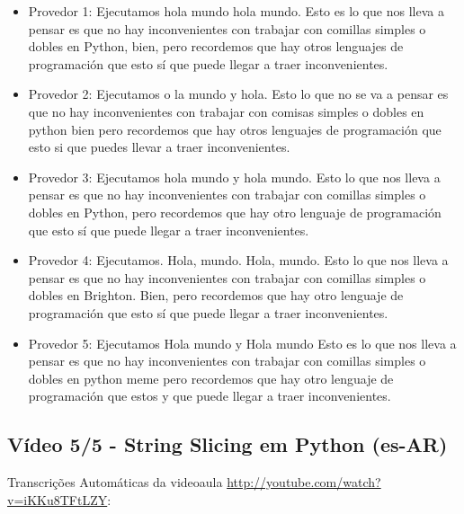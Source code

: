 \begin{itemize}
    \item Provedor 1: Ejecutamos hola mundo hola mundo. Esto es lo que nos lleva a pensar es que no hay inconvenientes con trabajar con comillas simples o dobles en Python, bien, pero recordemos que hay otros lenguajes de programación que esto sí que puede llegar a traer inconvenientes.
    \item Provedor 2: Ejecutamos o la mundo y hola. Esto lo que no se va a pensar es que no hay inconvenientes con trabajar con comisas simples o dobles en python bien pero recordemos que hay otros lenguajes de programación que esto si que puedes llevar a traer inconvenientes.
    \item Provedor 3: Ejecutamos hola mundo y hola mundo. Esto lo que nos lleva a pensar es que no hay inconvenientes con trabajar con comillas simples o dobles en Python, pero recordemos que hay otro lenguaje de programación que esto sí que puede llegar a traer inconvenientes.
    \item Provedor 4: Ejecutamos. Hola, mundo. Hola, mundo. Esto lo que nos lleva a pensar es que no hay inconvenientes con trabajar con comillas simples o dobles en Brighton. Bien, pero recordemos que hay otro lenguaje de programación que esto sí que puede llegar a traer inconvenientes.
    \item Provedor 5: Ejecutamos Hola mundo y Hola mundo Esto es lo que nos lleva a pensar es que no hay inconvenientes con trabajar con comillas simples o dobles en python meme pero recordemos que hay otro lenguaje de programación que estos y que puede llegar a traer inconvenientes.
\end{itemize}

\subsection{Vídeo 5/5 - String Slicing em Python (es-AR)}

\noindent
Transcrições Automáticas da videoaula \url{http://youtube.com/watch?v=iKKu8TFtLZY}:

